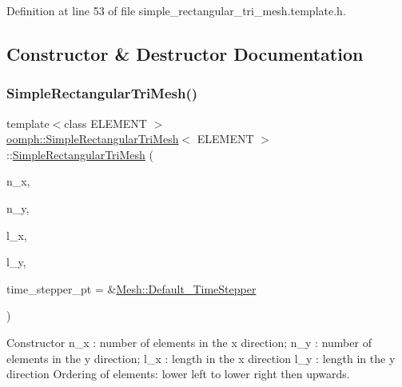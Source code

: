 Definition at line 53 of file simple\+\_\+rectangular\+\_\+tri\+\_\+mesh.\+template.\+h.



\subsection{Constructor \& Destructor Documentation}
\mbox{\label{classoomph_1_1SimpleRectangularTriMesh_a4a4e728bd6245b820d4698de28ee7d38}} 
\subsubsection{\texorpdfstring{Simple\+Rectangular\+Tri\+Mesh()}{SimpleRectangularTriMesh()}}
{\footnotesize\ttfamily template$<$class E\+L\+E\+M\+E\+NT $>$ \\
\hyperlink{classoomph_1_1SimpleRectangularTriMesh}{oomph\+::\+Simple\+Rectangular\+Tri\+Mesh}$<$ E\+L\+E\+M\+E\+NT $>$\+::\hyperlink{classoomph_1_1SimpleRectangularTriMesh}{Simple\+Rectangular\+Tri\+Mesh} (\begin{DoxyParamCaption}\item[{const unsigned \&}]{n\+\_\+x,  }\item[{const unsigned \&}]{n\+\_\+y,  }\item[{const double \&}]{l\+\_\+x,  }\item[{const double \&}]{l\+\_\+y,  }\item[{\hyperlink{classoomph_1_1TimeStepper}{Time\+Stepper} $\ast$}]{time\+\_\+stepper\+\_\+pt = {\ttfamily \&\hyperlink{classoomph_1_1Mesh_a12243d0fee2b1fcee729ee5a4777ea10}{Mesh\+::\+Default\+\_\+\+Time\+Stepper}} }\end{DoxyParamCaption})}



Constructor n\+\_\+x \+: number of elements in the x direction; n\+\_\+y \+: number of elements in the y direction; l\+\_\+x \+: length in the x direction l\+\_\+y \+: length in the y direction Ordering of elements\+: \textquotesingle{}lower left\textquotesingle{} to \textquotesingle{}lower right\textquotesingle{} then \textquotesingle{}upwards\textquotesingle{}. 

